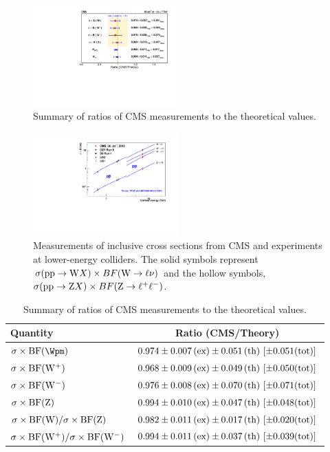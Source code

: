 \begin{figure}
\begin{center}
  \includegraphics[width=0.49\textwidth]{figs/Results_ratioTheory.pdf}
\caption[.]{\label{fig:RatioCMSTHY}
Summary of ratios of CMS measurements to the theoretical values. }
\end{center}
\end{figure}

\begin{figure}
\begin{center}
\includegraphics[width=0.5\textwidth]{figs/WZsigmas.pdf}
\caption[.]{\label{fig:WZsigmas}
Measurements of inclusive cross sections from CMS and experiments
at lower-energy colliders.  The solid symbols represent
$\sigma( \pp \to \Wo X)\times BF(\Wo\rightarrow\ell\nu)$ and the
hollow symbols, $\sigma(\pp\to\Zo X)\times BF(\Zo\rightarrow\ell^+\ell^-)$.}
\end{center}
\end{figure}


\begin{table}
\begin{center}
\caption[.]{ Summary of ratios of CMS measurements to the theoretical values. }
\begin{tabular}{|l|c|}
\hline
Quantity & Ratio (CMS/Theory) \\
\hline
$\SIGBRSHORT{\Wpm}$   & $\RATCMSTHYWI$ \\
$\SIGBRSHORT{\Wp}$     & $\RATCMSTHYWP$ \\
$\SIGBRSHORT{\Wm}$     & $\RATCMSTHYWM$ \\
$\SIGBRSHORT{\Zo}$       & $\RATCMSTHYZ$  \\
$\SIGBRSHORT{\Wo}/\SIGBRSHORT{\Zo}$     & $\RATCMSTHYWZ$ \\
$\SIGBRSHORT{\Wp}/\SIGBRSHORT{\Wm}$ & $\RATCMSTHYWW$ \\
\hline
\end{tabular}
\label{tab:RatioCMSTHY}
\end{center}
\end{table}

